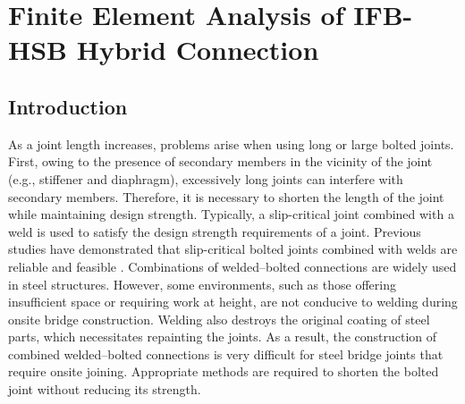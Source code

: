 \chapter{Finite Element Analysis of IFB-HSB Hybrid Connection}
\label{ch5}

\begin{spacing}{1.25} %
\minitoc %
\end{spacing} %
\onehalfspacing %

\section{Introduction}

As a joint length increases, problems arise when using  long or large bolted joints. First, owing to the presence of secondary members in the vicinity of the joint (e.g., stiffener and diaphragm), excessively long joints can interfere with secondary members. Therefore, it is necessary to shorten the length of the joint while maintaining design strength. Typically, a slip-critical joint combined with a weld is used to satisfy the design strength requirements of a joint. Previous studies have demonstrated that slip-critical bolted joints combined with welds are reliable and feasible \cite{solodov2021,Thomas2000,Chang2019361,KHANDEL2022107036}. Combinations of welded--bolted connections are widely used in steel structures. However, some environments, such as those offering insufficient space or requiring work at height, are not conducive to welding during onsite bridge construction. Welding also destroys the original coating of steel parts, which necessitates repainting the joints. As a result, the construction of combined welded--bolted connections is very difficult for steel bridge joints that require onsite joining. Appropriate methods are required to shorten the bolted joint without reducing its strength. \par

